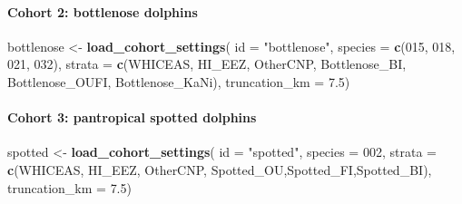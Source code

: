 \documentclass[
]{book}
\newenvironment{Shaded}{\begin{snugshade}}{\end{snugshade}}
\newcommand{\AttributeTok}[1]{\textcolor[rgb]{0.13,0.29,0.53}{#1}}
\newcommand{\FloatTok}[1]{\textcolor[rgb]{0.00,0.00,0.81}{#1}}
\newcommand{\FunctionTok}[1]{\textcolor[rgb]{0.13,0.29,0.53}{\textbf{#1}}}
\newcommand{\NormalTok}[1]{#1}
\newcommand{\OtherTok}[1]{\textcolor[rgb]{0.56,0.35,0.01}{#1}}
\newcommand{\StringTok}[1]{\textcolor[rgb]{0.31,0.60,0.02}{#1}}
\begin{document}
\hypertarget{cohort-2-bottlenose-dolphins}{%
\paragraph*{Cohort 2: bottlenose dolphins}\label{cohort-2-bottlenose-dolphins}}

\begin{Shaded}
\begin{Highlighting}[]
\NormalTok{bottlenose }\OtherTok{\textless{}{-}} \FunctionTok{load\_cohort\_settings}\NormalTok{(}
  \AttributeTok{id =} \StringTok{"bottlenose"}\NormalTok{,}
  \AttributeTok{species =} \FunctionTok{c}\NormalTok{(}\StringTok{\textquotesingle{}015\textquotesingle{}}\NormalTok{, }\StringTok{\textquotesingle{}018\textquotesingle{}}\NormalTok{, }\StringTok{\textquotesingle{}021\textquotesingle{}}\NormalTok{, }\StringTok{\textquotesingle{}032\textquotesingle{}}\NormalTok{),}
  \AttributeTok{strata =} \FunctionTok{c}\NormalTok{(}\StringTok{\textquotesingle{}WHICEAS\textquotesingle{}}\NormalTok{, }\StringTok{\textquotesingle{}HI\_EEZ\textquotesingle{}}\NormalTok{, }\StringTok{\textquotesingle{}OtherCNP\textquotesingle{}}\NormalTok{,}
             \StringTok{\textquotesingle{}Bottlenose\_BI\textquotesingle{}}\NormalTok{, }\StringTok{\textquotesingle{}Bottlenose\_OUFI\textquotesingle{}}\NormalTok{, }\StringTok{\textquotesingle{}Bottlenose\_KaNi\textquotesingle{}}\NormalTok{),}
  \AttributeTok{truncation\_km =} \FloatTok{7.5}\NormalTok{)}
\end{Highlighting}
\end{Shaded}

\hypertarget{cohort-3-pantropical-spotted-dolphins}{%
\paragraph*{Cohort 3: pantropical spotted dolphins}\label{cohort-3-pantropical-spotted-dolphins}}

\begin{Shaded}
\begin{Highlighting}[]
\NormalTok{spotted }\OtherTok{\textless{}{-}} \FunctionTok{load\_cohort\_settings}\NormalTok{(}
  \AttributeTok{id =} \StringTok{"spotted"}\NormalTok{,}
  \AttributeTok{species =} \StringTok{\textquotesingle{}002\textquotesingle{}}\NormalTok{,}
  \AttributeTok{strata =} \FunctionTok{c}\NormalTok{(}\StringTok{\textquotesingle{}WHICEAS\textquotesingle{}}\NormalTok{, }\StringTok{\textquotesingle{}HI\_EEZ\textquotesingle{}}\NormalTok{, }\StringTok{\textquotesingle{}OtherCNP\textquotesingle{}}\NormalTok{,}
             \StringTok{\textquotesingle{}Spotted\_OU\textquotesingle{}}\NormalTok{,}\StringTok{\textquotesingle{}Spotted\_FI\textquotesingle{}}\NormalTok{,}\StringTok{\textquotesingle{}Spotted\_BI\textquotesingle{}}\NormalTok{),}
  \AttributeTok{truncation\_km =} \FloatTok{7.5}\NormalTok{)}
\end{Highlighting}
\end{Shaded}
\end{document}
